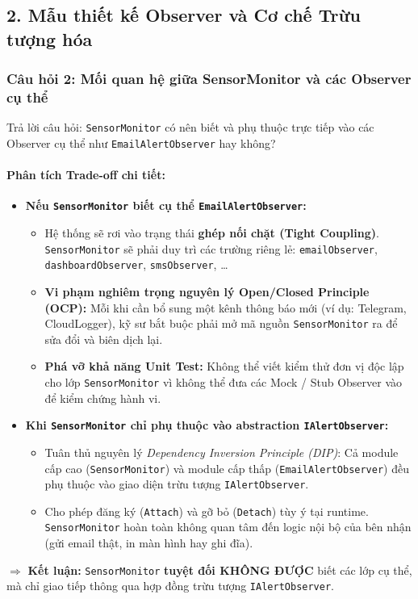 \documentclass[11pt,a4paper]{article}
\begin{document}
\subsection{2. Mẫu thiết kế Observer và Cơ chế Trừu tượng hóa}

\subsubsection{Câu hỏi 2: Mối quan hệ giữa SensorMonitor và các Observer cụ thể}
Trả lời câu hỏi: \texttt{SensorMonitor} có nên biết và phụ thuộc trực tiếp vào các Observer cụ thể như \texttt{EmailAlertObserver} hay không?

\paragraph{Phân tích Trade-off chi tiết:}
\begin{itemize}[itemsep=1.5pt]
    \item \textbf{Nếu \texttt{SensorMonitor} biết cụ thể \texttt{EmailAlertObserver}:}
    \begin{itemize}
        \item Hệ thống sẽ rơi vào trạng thái \textbf{ghép nối chặt (Tight Coupling)}. \texttt{SensorMonitor} sẽ phải duy trì các trường riêng lẻ: \texttt{emailObserver}, \texttt{dashboardObserver}, \texttt{smsObserver}, \dots
        \item \textbf{Vi phạm nghiêm trọng nguyên lý Open/Closed Principle (OCP):} Mỗi khi cần bổ sung một kênh thông báo mới (ví dụ: Telegram, CloudLogger), kỹ sư bắt buộc phải mở mã nguồn \texttt{SensorMonitor} ra để sửa đổi và biên dịch lại.
        \item \textbf{Phá vỡ khả năng Unit Test:} Không thể viết kiểm thử đơn vị độc lập cho lớp \texttt{SensorMonitor} vì không thể đưa các Mock / Stub Observer vào để kiểm chứng hành vi.
    \end{itemize}
    \item \textbf{Khi \texttt{SensorMonitor} chỉ phụ thuộc vào abstraction \texttt{IAlertObserver}:}
    \begin{itemize}
        \item Tuân thủ nguyên lý \textit{Dependency Inversion Principle (DIP)}: Cả module cấp cao (\texttt{SensorMonitor}) và module cấp thấp (\texttt{EmailAlertObserver}) đều phụ thuộc vào giao diện trừu tượng \texttt{IAlertObserver}.
        \item Cho phép đăng ký (\texttt{Attach}) và gỡ bỏ (\texttt{Detach}) tùy ý tại runtime. \texttt{SensorMonitor} hoàn toàn không quan tâm đến logic nội bộ của bên nhận (gửi email thật, in màn hình hay ghi đĩa).
    \end{itemize}
\end{itemize}
$\Rightarrow$ \textbf{Kết luận:} \texttt{SensorMonitor} \textbf{tuyệt đối KHÔNG ĐƯỢC} biết các lớp cụ thể, mà chỉ giao tiếp thông qua hợp đồng trừu tượng \texttt{IAlertObserver}.
\end{document}
